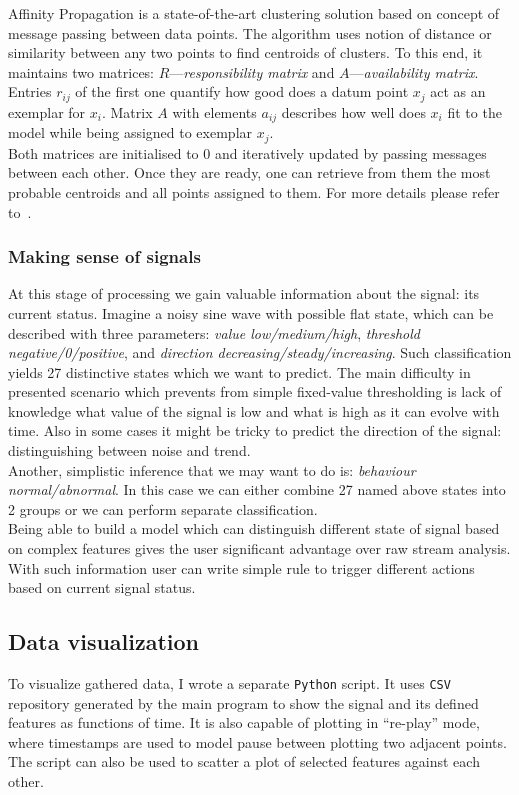 \documentclass[11pt, letterpaper]{article}            %
\begin{document}
Affinity Propagation is a state-of-the-art clustering solution based on concept of message passing between data points. The algorithm uses notion of distance or similarity between any two points to find centroids of clusters. To this end, it maintains two matrices: $R$---\emph{responsibility matrix} and $A$---\emph{availability matrix}. Entries $r_{ij}$ of the first one quantify how good does a datum point $x_j$ act as an exemplar for $x_i$. Matrix $A$ with elements $a_{ij}$ describes how well does $x_i$ fit to the model while being assigned to exemplar $x_j$.\\
Both matrices are initialised to $0$ and iteratively updated by passing messages between each other. Once they are ready, one can retrieve from them the most probable centroids and all points assigned to them. For more details please refer to~\citep{frey07affinitypropagation}.\\

\subsubsection{Making sense of signals}
At this stage of processing we gain valuable information about the signal: its current status. Imagine a noisy sine wave with possible flat state, which can be described with three parameters: \emph{value low/medium/high}, \emph{threshold negative/0/positive}, and \emph{direction decreasing/steady/increasing}. Such classification yields 27 distinctive states which we want to predict. The main difficulty in presented scenario which prevents from simple fixed-value thresholding is lack of knowledge what value of the signal is low and what is high as it can evolve with time. Also in some cases it might be tricky to predict the direction of the signal: distinguishing between noise and trend.\\
Another, simplistic inference that we may want to do is: \emph{behaviour normal/abnormal}. In this case  we can either combine 27 named above states into 2 groups or we can perform separate classification.\\

Being able to build a model which can distinguish different state of signal based on complex features gives the user significant advantage over raw stream analysis. With such information user can write simple rule to trigger different actions based on current signal status.

\subsection{Data visualization}
To visualize gathered data, I wrote a separate \texttt{Python} script. It uses \texttt{CSV} repository generated by the main program to show the signal and its defined features as functions of time. It is also capable of plotting in ``re-play'' mode, where timestamps are used to model pause between plotting two adjacent points.\\
The script can also be used to scatter a plot of selected features against each other.\\
\end{document}
